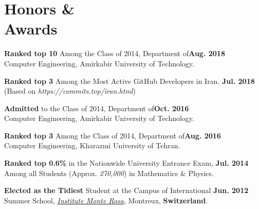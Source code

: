 \newpage
\section{\sc Honors \& \\ Awards}
\textbf{Ranked top 10} Among the Class of 2014, Department of\hfill {\textbf{Aug. 2018}}\\ Computer Engineering, Amirkabir University of Technology.

\textbf{Ranked top 3} Among the Most Active GitHub Developers in Iran. \hfill {\textbf{Jul. 2018}}\\ (Based on \textit{https://commits.top/iran.html})

\textbf{Admitted} to the Class of 2014, Department of\hfill {\textbf{Oct. 2016}}\\ Computer Engineering, Amirkabir University of Technology.

\textbf{Ranked top 3} Among the Class of 2014, Department of\hfill {\textbf{Aug. 2016}}\\ Computer Engineering, Kharazmi University of Tehran.

\textbf{Ranked top 0.6\%} in the Nationwide University Entrance Exam, \hfill {\textbf{Jul. 2014}}\\ Among all Students (Approx. \textit{270,000}) in Mathematics \& Physics.

\textbf{Elected as the Tidiest} Student at the Campus of International \hfill {\textbf{Jun. 2012}}\\ Summer School, \textit{\href{https://www.monterosa.ch/}{Institute Monte Rosa}}, Montreux, \textbf{Switzerland}.


\endinput